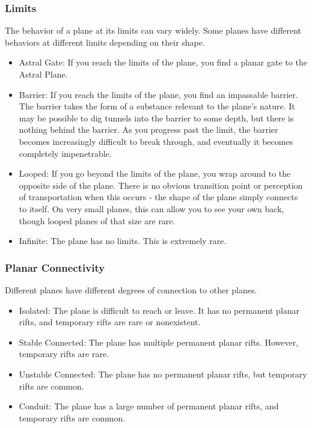     \subsubsection{Limits} The behavior of a plane at its limits can vary widely.
      Some planes have different behaviors at different limits depending on their shape.
      \begin{itemize}
        \item Astral Gate: If you reach the limits of the plane, you find a planar gate to the Astral Plane.
        \item Barrier: If you reach the limits of the plane, you find an impassable barrier.
          The barrier takes the form of a substance relevant to the plane's nature.
          It may be possible to dig tunnels into the barrier to some depth, but there is nothing behind the barrier.
          As you progress past the limit, the barrier becomes increasingly difficult to break through, and eventually it becomes completely impenetrable.
        \item Looped: If you go beyond the limits of the plane, you wrap around to the opposite side of the plane.
          There is no obvious transition point or perception of transportation when this occurs - the shape of the plane simply connects to itself.
          On very small planes, this can allow you to see your own back, though looped planes of that size are rare.
        \item Infinite: The plane has no limits. This is extremely rare.
      \end{itemize}

    \subsubsection{Planar Connectivity}
      Different planes have different degrees of connection to other planes.
      \begin{itemize}
        \item Isolated: The plane is difficult to reach or leave.
          It has no permanent planar rifts, and temporary rifts are rare or nonexistent.
        \item Stable Connected: The plane has multiple permanent planar rifts.
          However, temporary rifts are rare.
        \item Unstable Connected: The plane has no permanent planar rifts, but temporary rifts are common.
        \item Conduit: The plane has a large number of permanent planar rifts, and temporary rifts are common.
      \end{itemize}

